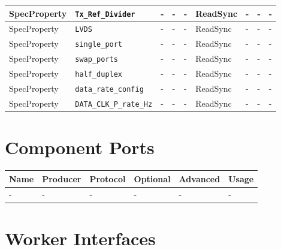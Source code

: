 \documentclass{article}
\begin{document}
\begin{landscape}
\begin{scriptsize}
\begin{longtable}{|p{2cm}|p{4cm}|p{1cm}|p{2cm}|p{2cm}|p{2cm}|p{2cm}|p{1cm}|p{4.58cm}|}
			\hline
			SpecProperty & \verb+Tx_Ref_Divider+ & - & - & - & ReadSync  & - & - & - \\
			\hline
			SpecProperty & \verb+LVDS+ & - & - & - & ReadSync & - & - & - \\
			\hline
			SpecProperty & \verb+single_port+ & - & - & - & ReadSync & - & - & - \\
			\hline
			SpecProperty & \verb+swap_ports+ & - & - & - & ReadSync & - & - & - \\
			\hline
			SpecProperty & \verb+half_duplex+ & - & - & - & ReadSync & - & - & - \\
			\hline
			SpecProperty & \verb+data_rate_config+ & - & - & - & ReadSync & - & - & - \\
			\hline
			SpecProperty & \verb+DATA_CLK_P_rate_Hz+ & - & - & - & ReadSync  & - & - & - \\
			\hline
		\end{longtable}
	\end{scriptsize}
\pagebreak
	\section*{Component Ports}
	\begin{scriptsize}
		\begin{tabular}{|p{2cm}|p{1.5cm}|p{4cm}|p{1.5cm}|p{1.5cm}|p{9.38cm}|}
			\hline
			\rowcolor{blue}
			Name & Producer & Protocol           & Optional & Advanced & Usage                  \\
			\hline
			-  & -     & - & -     & -        & - \\
			\hline
		\end{tabular}
	\end{scriptsize}
	\section*{Worker Interfaces}

\end{landscape}
\end{document}
